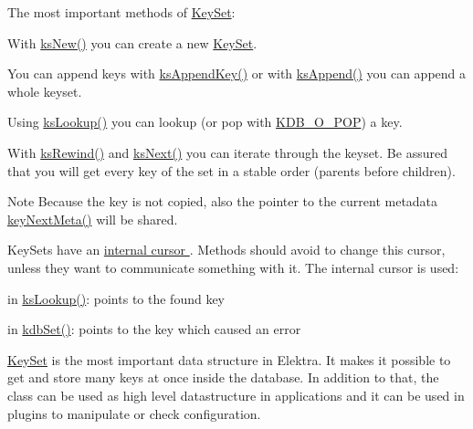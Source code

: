 The most important methods of \hyperlink{classkdb_1_1KeySet}{Key\+Set}\+:


\begin{DoxyItemize}
\item With \hyperlink{group__keyset_ga671e1aaee3ae9dc13b4834a4ddbd2c3c}{ks\+New()} you can create a new \hyperlink{classkdb_1_1KeySet}{Key\+Set}.
\item You can append keys with \hyperlink{group__keyset_gaa5a1d467a4d71041edce68ea7748ce45}{ks\+Append\+Key()} or with \hyperlink{group__keyset_ga21eb9c3a14a604ee3a8bdc779232e7b7}{ks\+Append()} you can append a whole keyset.
\item Using \hyperlink{group__keyset_gaa34fc43a081e6b01e4120daa6c112004}{ks\+Lookup()} you can lookup (or pop with \hyperlink{group__keyset_gga98a3d6a4016c9dad9cbd1a99a9c2a45aa52fb5f2cc86773d393da62bebebf7984}{K\+D\+B\+\_\+\+O\+\_\+\+P\+OP}) a key.
\item With \hyperlink{group__keyset_gabe793ff51f1728e3429c84a8a9086b70}{ks\+Rewind()} and \hyperlink{group__keyset_ga317321c9065b5a4b3e33fe1c399bcec9}{ks\+Next()} you can iterate through the keyset. Be assured that you will get every key of the set in a stable order (parents before children).
\end{DoxyItemize}

\begin{DoxyNote}{Note}
Because the key is not copied, also the pointer to the current metadata \hyperlink{group__keymeta_ga4c88342f580a4291455a801af71ce048}{key\+Next\+Meta()} will be shared.
\end{DoxyNote}
Key\+Sets have an \hyperlink{group__keyset_ga4287b9416912c5f2ab9c195cb74fb094}{internal cursor }. Methods should avoid to change this cursor, unless they want to communicate something with it. The internal cursor is used\+:


\begin{DoxyItemize}
\item in \hyperlink{group__keyset_gaa34fc43a081e6b01e4120daa6c112004}{ks\+Lookup()}\+: points to the found key
\item in \hyperlink{group__kdb_ga11436b058408f83d303ca5e996832bcf}{kdb\+Set()}\+: points to the key which caused an error
\end{DoxyItemize}

\hyperlink{classkdb_1_1KeySet}{Key\+Set} is the most important data structure in Elektra. It makes it possible to get and store many keys at once inside the database. In addition to that, the class can be used as high level datastructure in applications and it can be used in plugins to manipulate or check configuration.

